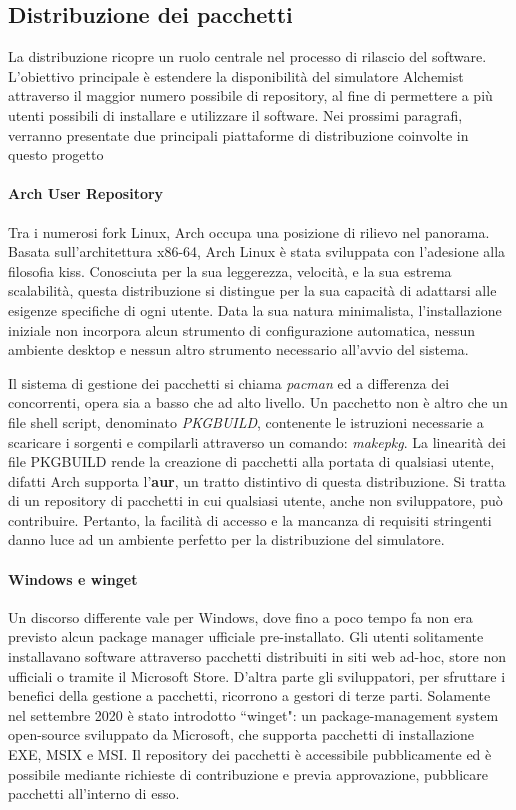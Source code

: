 \subsection{Distribuzione dei pacchetti}

La distribuzione ricopre un ruolo centrale nel processo di rilascio del software. L'obiettivo principale è estendere la disponibilità del simulatore Alchemist attraverso il maggior numero possibile di repository, al fine di permettere a più utenti possibili di installare e utilizzare il software. Nei prossimi paragrafi, verranno presentate due principali piattaforme di distribuzione coinvolte in questo progetto

\paragraph{Arch User Repository} Tra i numerosi fork Linux, Arch occupa una posizione di rilievo nel panorama. Basata sull'architettura x86-64, Arch Linux è stata sviluppata con l'adesione alla filosofia \ac{kiss}. Conosciuta per la sua leggerezza, velocità, e la sua estrema scalabilità, questa distribuzione si distingue per la sua capacità di adattarsi alle esigenze specifiche di ogni utente. Data la sua natura minimalista, l'installazione iniziale non incorpora alcun strumento di configurazione automatica, nessun ambiente desktop e nessun altro strumento necessario all'avvio del sistema. 

Il sistema di gestione dei pacchetti si chiama \textit{pacman} ed a differenza dei concorrenti, opera sia a basso che ad alto livello. Un pacchetto non è altro che un file shell script, denominato \textit{PKGBUILD}, contenente le istruzioni necessarie a scaricare i sorgenti e compilarli attraverso un comando: \textit{makepkg}. La linearità dei file PKGBUILD rende la creazione di pacchetti alla portata di qualsiasi utente, difatti Arch supporta l'\textbf{\ac{aur}}, un tratto distintivo di questa distribuzione. Si tratta di un repository di pacchetti in cui qualsiasi utente, anche non sviluppatore, può contribuire. Pertanto, la facilità di accesso e la mancanza di requisiti stringenti danno luce ad un ambiente perfetto per la distribuzione del simulatore.

\paragraph{Windows e winget} Un discorso differente vale per Windows, dove fino a poco tempo fa non era previsto alcun package manager ufficiale pre-installato. Gli utenti solitamente installavano software attraverso pacchetti distribuiti in siti web ad-hoc, store non ufficiali o tramite il Microsoft Store. D'altra parte gli sviluppatori, per sfruttare i benefici della gestione a pacchetti, ricorrono a gestori di terze parti. Solamente nel settembre 2020 è stato introdotto ``winget": un package-management system open-source sviluppato da Microsoft, che supporta pacchetti di installazione EXE, MSIX e MSI. Il repository dei pacchetti è accessibile pubblicamente ed è possibile mediante richieste di contribuzione e previa approvazione, pubblicare pacchetti all'interno di esso. \\

